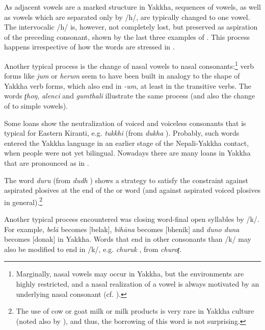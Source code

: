 As adjacent vowels are a marked structure in Yakkha, sequences of vowels, as well as  vowels which are separated only by /h/, are typically changed to one vowel. The intervocalic /h/ is, however, not completely lost, but preserved as aspiration of the preceding consonant, shown by the last three examples of . This process  happens irrespective of how the words are stressed in .

 Another typical process is the change of nasal vowels to nasal consonants:\footnote{Marginally, nasal vowels may occur in Yakkha, but the environments are highly restricted, and a nasal realization of a vowel is always motivated by an underlying nasal consonant (cf. ).}   verb forms like  \emph{jum}  or \emph{herum}  seem to have been built in analogy to the shape of Yakkha  verb forms, which also end in \emph{-um}, at least in the transitive verbs. The words  \emph{ʈhoŋ}, \emph{alenci} and \emph{gumthali} illustrate the same process (and also the change of  to simple vowels). 
 
Some loans show the neutralization of voiced and voiceless consonants that is typical for Eastern Kiranti, e.g. \emph{tukkhi} (from  \emph{dukha} ). Probably, such  words entered the Yakkha language in an earlier stage of the Nepali-Yakkha contact, when people were not yet bilingual. Nowadays there are many  loans in Yakkha that are pronounced as in . 
 
 The word \emph{duru} (from  \emph{dudh} ) shows a strategy to satisfy the constraint against aspirated plosives at the end of the  or word (and against aspirated voiced plosives in general).\footnote{The use of cow or goat milk or milk products is very rare in Yakkha culture (noted also by \citealt[128--30]{Russell1992_Yakha}), and thus, the borrowing of this word is not surprising.} 
 
 Another typical process  encountered was closing word-final open syllables by /k/. For example, \emph{belā}   becomes [belak], \emph{bihāna}   becomes [bhenik] and \emph{duno \ti duna}  becomes [donak] in Yakkha. Words that end in other consonants than /k/ may also be modified to end in /k/, e.g. \emph{churuk} , from  \emph{churoʈ}.

